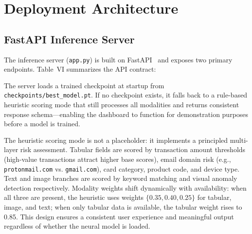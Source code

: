 \documentclass[10pt,conference,letterpaper]{IEEEtran}
\begin{document}
\section{Deployment Architecture}

\subsection{FastAPI Inference Server}

The inference server (\texttt{app.py}) is built on FastAPI~\cite{FastAPI} and exposes
two primary endpoints. Table~VI summarizes the API contract:

\begin{table}[H]
\caption{API Endpoint Specification}
\label{tab:api}
\begin{center}
\end{center}
\end{table}

The server loads a trained checkpoint at startup from
\texttt{checkpoints/best\_model.pt}. If no checkpoint exists, it falls back to a
rule-based heuristic scoring mode that still processes all modalities and returns
consistent response schema---enabling the dashboard to function for demonstration
purposes before a model is trained.

The heuristic scoring mode is not a placeholder: it implements a principled multi-layer
risk assessment. Tabular fields are scored by transaction amount thresholds (high-value
transactions attract higher base scores), email domain risk (e.g., \texttt{protonmail.com}
vs. \texttt{gmail.com}), card category, product code, and device type. Text and image
branches are scored by keyword matching and visual anomaly detection respectively.
Modality weights shift dynamically with availability: when all three are present, the
heuristic uses weights $\{0.35, 0.40, 0.25\}$ for tabular, image, and text; when only
tabular data is available, the tabular weight rises to 0.85. This design ensures a
consistent user experience and meaningful output regardless of whether the neural model
is loaded.
\end{document}
